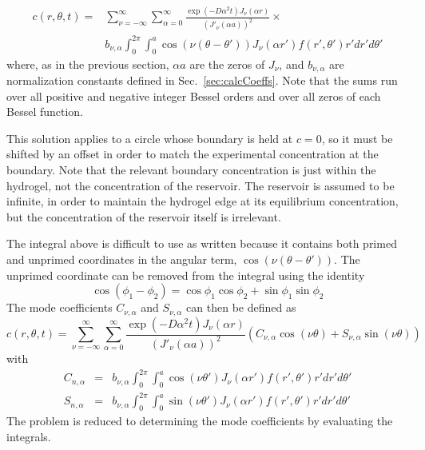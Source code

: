 \begin{equation}
\begin{split}
c(r,\theta,t) =& \sum_{\nu=-\infty}^{\infty} \sum_{\alpha = 0}^\infty   \frac{\exp\left(-D\alpha^2t\right)J_\nu\left(\alpha r\right)}{\left(J'_\nu(\alpha a)\right)^2} \times \\ 
&b_{\nu,\alpha} \int_0^{2\pi} \int_0^a \cos\left(\nu(\theta-\theta')\right) J_\nu(\alpha r') f(r',\theta') r' dr' d\theta' \label{eq:full-series}
\end{split}
\end{equation}
where, as in the previous section, $\alpha a$ are the zeros of $J_\nu$, and $b_{\nu,\alpha}$ are normalization constants defined in Sec.~\ref{sec:calcCoeffs}.  Note that the sums run over all positive and negative integer Bessel orders and over all zeros of each Bessel function.  

This solution applies to a circle whose boundary is held at $c=0$, so it must be shifted by an offset in order to match the experimental concentration at the boundary.  Note that the relevant boundary concentration is just within the hydrogel, not the concentration of the reservoir.  The reservoir is assumed to be infinite, in order to maintain the hydrogel edge at its equilibrium concentration, but the concentration of the reservoir itself is irrelevant.

The integral above is difficult to use as written because it contains both primed and unprimed coordinates in the angular term, $\cos\left(\nu(\theta -\theta')\right)$.  The unprimed coordinate can be removed from the integral using the identity $$\cos(\phi_1-\phi_2) = \cos\phi_1\cos\phi_2 + \sin\phi_1\sin\phi_2$$ The mode coefficients $C_{\nu,\alpha}$ and $S_{\nu,\alpha}$ can then be defined as
\begin{equation}
c(r,\theta,t) = \sum_{\nu=-\infty}^{\infty} \sum_{\alpha = 0}^\infty   \frac{\exp\left(-D\alpha^2t\right)J_\nu\left(\alpha r\right)}{\left(J'_\nu (\alpha a)\right)^2} \left(C_{\nu,\alpha}\cos(\nu\theta) + S_{\nu,\alpha} \sin(\nu\theta)\right)
\label{eq:c-s-series}
\end{equation}
with 
\begin{eqnarray}
C_{n,\alpha} & = &b_{\nu,\alpha} \int_0^{2\pi} \int_0^a \cos\left(\nu\theta'\right) J_\nu(\alpha r')f(r',\theta') r' dr' d\theta' \label{eq:cos-defn}\\
S_{n,\alpha} & = & b_{\nu,\alpha}\int_0^{2\pi} \int_0^a \sin\left(\nu\theta'\right) J_\nu(\alpha r') f(r',\theta') r' dr' d\theta' \label{eq:sin-defn}
\end{eqnarray}
The problem is reduced to determining the mode coefficients by evaluating the integrals.

